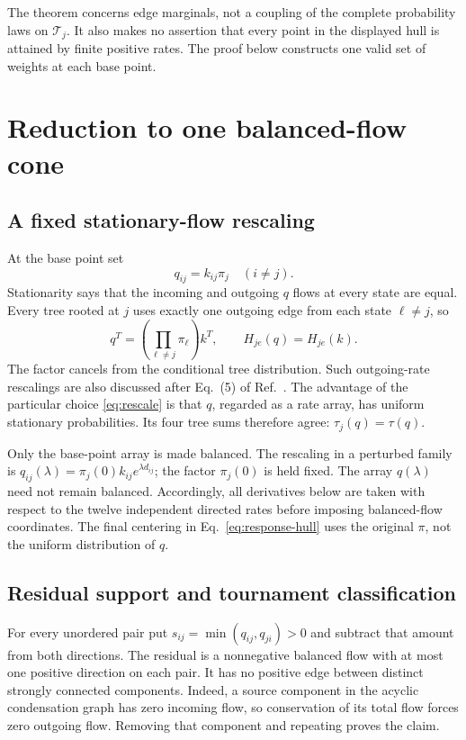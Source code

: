 \documentclass[11pt,a4paper]{article}
\newcommand{\T}{\mathcal T}
\begin{document}
The theorem concerns edge marginals, not a coupling of the complete
probability laws on $\T_j$. It also makes no assertion that every point
in the displayed hull is attained by finite positive rates. The proof
below constructs one valid set of weights at each base point.

\section{Reduction to one balanced-flow cone}
\label{sec:cone}

\subsection{A fixed stationary-flow rescaling}

At the base point set
\begin{equation}
 q_{ij}=k_{ij}\pi_j\quad(i\ne j).
 \label{eq:rescale}
\end{equation}
Stationarity says that the incoming and outgoing $q$ flows at every state
are equal. Every tree rooted at $j$ uses exactly one outgoing edge from
each state $\ell\ne j$, so
\begin{equation}
 q^T=\left(\prod_{\ell\ne j}\pi_\ell\right)k^T,
 \qquad H_{je}(q)=H_{je}(k).
 \label{eq:invariance}
\end{equation}
The factor cancels from the conditional tree distribution. Such
outgoing-rate rescalings are also discussed after Eq.~(5) of
Ref.~\cite{FancherHorowitz2026}. The advantage of the particular choice
\eqref{eq:rescale} is that $q$, regarded as a rate array, has uniform
stationary probabilities. Its four tree sums therefore agree:
$\tau_j(q)=\tau(q)$.

Only the base-point array is made balanced. The rescaling in a perturbed
family is $q_{ij}(\lambda)=\pi_j(0)k_{ij}e^{\lambda d_{ij}}$; the factor
$\pi_j(0)$ is held fixed. The array $q(\lambda)$ need not remain balanced.
Accordingly, all derivatives below are taken with respect to the twelve
independent directed rates before imposing balanced-flow coordinates.
The final centering in Eq.~\eqref{eq:response-hull} uses the original
$\pi$, not the uniform distribution of $q$.

\subsection{Residual support and tournament classification}

For every unordered pair put $s_{ij}=\min(q_{ij},q_{ji})>0$ and subtract
that amount from both directions. The residual is a nonnegative balanced
flow with at most one positive direction on each pair. It has no positive
edge between distinct strongly connected components. Indeed, a source
component in the acyclic condensation graph has zero incoming flow, so
conservation of its total flow forces zero outgoing flow. Removing that
component and repeating proves the claim.
\end{document}
